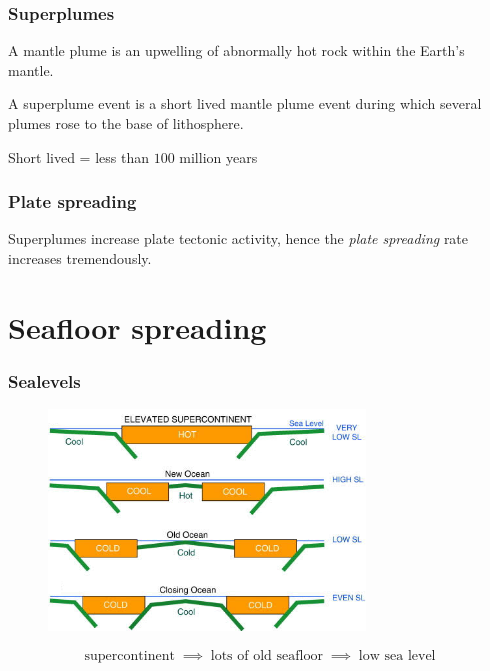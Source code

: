 \documentclass{beamer}
\begin{document}
        \begin{frame}
        \frametitle{Superplumes}
        A \alert{mantle plume} is an upwelling of abnormally hot rock within the Earth's mantle.

        A \alert{superplume} event is a short lived mantle plume event during which several plumes rose to the base of lithosphere.
        \pause

        \begin{center}
        Short lived = less than $100$ million years
        \end{center}
        \end{frame}

        \begin{frame}
        \frametitle{Plate spreading}
        \begin{figure}[h!]
                \centering    
        \end{figure}  

        Superplumes increase plate tectonic activity, hence the \emph{plate spreading} rate increases tremendously.
        \end{frame}
        
        \section{Seafloor spreading}
        
        \begin{frame}
        \frametitle{Sealevels}
        \begin{figure}
        \begin{center}
                \includegraphics[width=0.75\textwidth]{seafloor.png}
        \end{center}
        \end{figure}
        \[
        \text{supercontinent} \;\implies\; \text{lots of old seafloor} \;\implies\; \text{low sea level}
        \]
        \end{frame}
\end{document}
